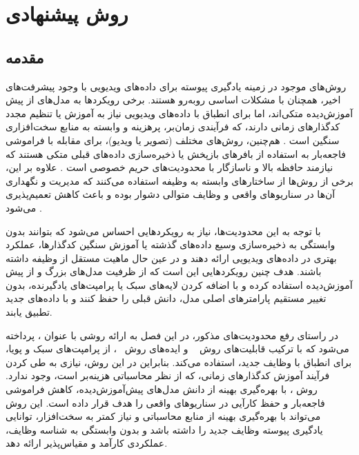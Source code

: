 \chapter{روش پیشنهادی}

\section{مقدمه}

روش‌های موجود در زمینه یادگیری پیوسته برای داده‌های ویدیویی با وجود پیشرفت‌های اخیر، همچنان با مشکلات اساسی روبه‌رو هستند. برخی رویکردها به مدل‌های از پیش آموزش‌دیده متکی‌اند، اما برای انطباق با داده‌های ویدیویی نیاز به آموزش یا تنظیم مجدد کدگذارهای زمانی دارند، که فرآیندی زمان‌بر، پرهزینه و وابسته به منابع سخت‌افزاری سنگین است \cite{pivot}. هم‌چنین، روش‌های مختلف (تصویر یا ویدیو)، برای مقابله با فراموشی فاجعه‌بار به استفاده از بافرهای بازپخش یا ذخیره‌سازی داده‌های قبلی متکی هستند که نیازمند حافظه بالا و ناسازگار با محدودیت‌های حریم خصوصی است
\cite{pivot,9,memory-1}
. علاوه بر این، برخی از روش‌ها از ساختارهای وابسته به وظیفه
استفاده می‌کنند که مدیریت و نگهداری آن‌ها در سناریوهای واقعی و وظایف متوالی دشوار بوده و باعث کاهش تعمیم‌پذیری می‌شود \cite{task-specific-1,task-specific-2}.

با توجه به این محدودیت‌ها، نیاز به رویکردهایی احساس می‌شود که بتوانند بدون وابستگی به ذخیره‌سازی وسیع داده‌های گذشته یا آموزش سنگین کدگذارها، عملکرد بهتری در داده‌های ویدیویی ارائه دهند و در عین حال ماهیت مستقل از وظیفه
 داشته باشند. هدف چنین رویکردهایی این است که از ظرفیت مدل‌های بزرگ و از پیش آموزش‌دیده استفاده کرده و با اضافه کردن لایه‌های سبک یا پرامپت‌های یادگیرنده، بدون تغییر مستقیم پارامتر‌های اصلی مدل، دانش قبلی را حفظ کنند و با داده‌های جدید تطبیق یابند.

در راستای رفع محدودیت‌های مذکور، در این فصل به ارائه روشی با عنوان
،
پرداخته‌ می‌شود که با ترکیب قابلیت‌های روش
~\cite{open-vclip}
و ایده‌های روش
~\cite{l2p}، 
از پرامپت‌های سبک و پویا، برای انطباق با وظایف جدید، استفاده می‌کند. بنابراین در این روش، نیازی به طی کردن فرآیند آموزش کدگذارهای زمانی، که از نظر محاسباتی هزینه‌بر است، وجود ندارد.
روش ، با بهره‌گیری بهینه از دانش مدل‌های پیش‌آموزش‌دیده، کاهش فراموشی فاجعه‌بار و حفظ کارآیی در سناریوهای واقعی را هدف قرار داده است. این روش می‌تواند با بهره‌گیری بهینه از منابع محاسباتی و نیاز کمتر به سخت‌افزار، توانایی یادگیری پیوسته وظایف جدید را داشته باشد و بدون وابستگی به شناسه وظایف، عملکردی کارآمد و مقیاس‌پذیر ارائه دهد.


